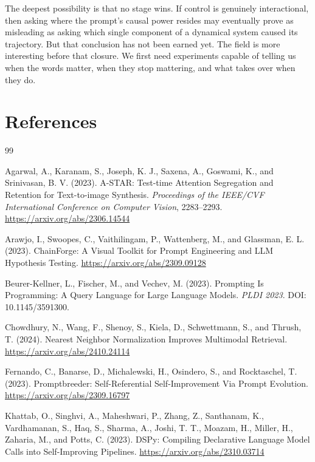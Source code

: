 \documentclass[11pt]{article}
\begin{document}
The deepest possibility is that no stage wins. If control is genuinely interactional, then asking where the prompt's causal power resides may eventually prove as misleading as asking which single component of a dynamical system caused its trajectory. But that conclusion has not been earned yet. The field is more interesting before that closure. We first need experiments capable of telling us when the words matter, when they stop mattering, and what takes over when they do.

\section*{References}

\begin{thebibliography}{99}

Agarwal, A., Karanam, S., Joseph, K. J., Saxena, A., Goswami, K., and Srinivasan, B. V. (2023).
A-STAR: Test-time Attention Segregation and Retention for Text-to-image Synthesis.
\emph{Proceedings of the IEEE/CVF International Conference on Computer Vision}, 2283--2293.
\url{https://arxiv.org/abs/2306.14544}

Arawjo, I., Swoopes, C., Vaithilingam, P., Wattenberg, M., and Glassman, E. L. (2023).
ChainForge: A Visual Toolkit for Prompt Engineering and LLM Hypothesis Testing.
\url{https://arxiv.org/abs/2309.09128}

Beurer-Kellner, L., Fischer, M., and Vechev, M. (2023).
Prompting Is Programming: A Query Language for Large Language Models.
\emph{PLDI 2023}. DOI: 10.1145/3591300.

Chowdhury, N., Wang, F., Shenoy, S., Kiela, D., Schwettmann, S., and Thrush, T. (2024).
Nearest Neighbor Normalization Improves Multimodal Retrieval.
\url{https://arxiv.org/abs/2410.24114}

Fernando, C., Banarse, D., Michalewski, H., Osindero, S., and Rocktaschel, T. (2023).
Promptbreeder: Self-Referential Self-Improvement Via Prompt Evolution.
\url{https://arxiv.org/abs/2309.16797}

Khattab, O., Singhvi, A., Maheshwari, P., Zhang, Z., Santhanam, K., Vardhamanan, S., Haq, S., Sharma, A., Joshi, T. T., Moazam, H., Miller, H., Zaharia, M., and Potts, C. (2023).
DSPy: Compiling Declarative Language Model Calls into Self-Improving Pipelines.
\url{https://arxiv.org/abs/2310.03714}


\end{thebibliography}
\end{document}
